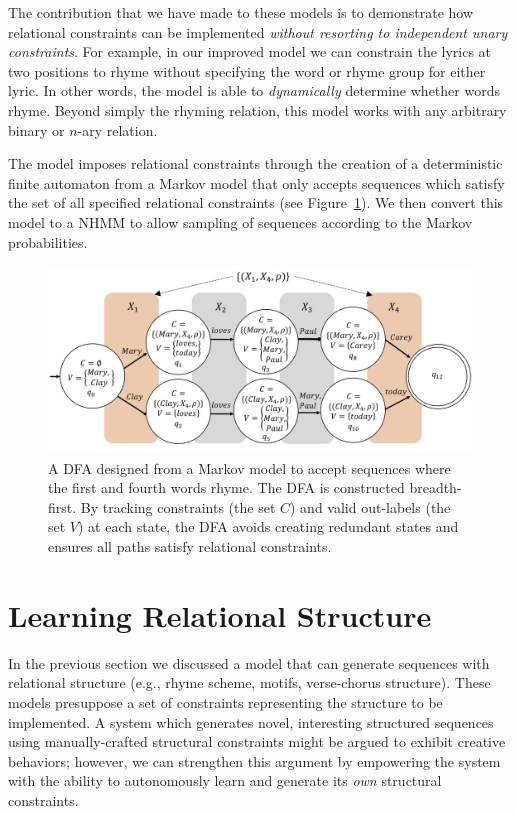 \documentclass[letterpaper]{article}
\begin{document}
The contribution that we have made to these models is to demonstrate how relational constraints can be implemented \emph{without resorting to independent unary constraints}. For example, in our improved model we can constrain the lyrics at two positions to rhyme without specifying the word or rhyme group for either lyric. In other words, the model is able to \emph{dynamically} determine whether words rhyme. Beyond simply the rhyming relation, this model works with any arbitrary binary or $n$-ary relation.

The model imposes relational constraints through the creation of a deterministic finite automaton from a Markov model that only accepts sequences which satisfy the set of all specified relational constraints (see Figure~\ref{fig:dfa}). We then convert this model to a NHMM to allow sampling of sequences according to the Markov probabilities.

\begin{figure}
	\centering
	\includegraphics[width=\linewidth]{DFA}
	\caption{\label{fig:dfa} A DFA designed from a Markov model to accept sequences where the first and fourth words rhyme. The DFA is constructed breadth-first. By tracking constraints (the set $C$) and valid out-labels (the set $V$) at each state, the DFA avoids creating redundant states and ensures all paths satisfy relational constraints.}
\end{figure}

\section{Learning Relational Structure}

In the previous section we discussed a model that can generate sequences with relational structure (e.g., rhyme scheme, motifs, verse-chorus structure). These models presuppose a set of constraints representing the structure to be implemented. A system which generates novel, interesting structured sequences using manually-crafted structural constraints might be argued to exhibit creative behaviors; however, we can strengthen this argument by empowering the system with the ability to autonomously learn and generate its \emph{own} structural constraints.
\end{document}
